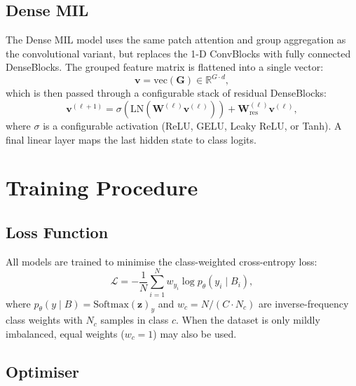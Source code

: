\documentclass[11pt,a4paper]{article}
\begin{document}
\subsection{Dense MIL}
\label{sec:dense}

The Dense MIL model uses the same patch attention and group aggregation as the
convolutional variant, but replaces the 1-D ConvBlocks with fully connected
DenseBlocks. The grouped feature matrix is flattened into a single vector:
\begin{equation}
  \mathbf{v} = \text{vec}(\mathbf{G}) \in \mathbb{R}^{G \cdot d},
\end{equation}
which is then passed through a configurable stack of residual DenseBlocks:
\begin{equation}
  \mathbf{v}^{(\ell+1)} = \sigma\!\left(\text{LN}\!\left(\mathbf{W}^{(\ell)}\mathbf{v}^{(\ell)}\right)\right) + \mathbf{W}_{\text{res}}^{(\ell)}\mathbf{v}^{(\ell)},
\end{equation}
where $\sigma$ is a configurable activation (ReLU, GELU, Leaky ReLU, or Tanh).
A final linear layer maps the last hidden state to class logits.

\section{Training Procedure}
\label{sec:training}

\subsection{Loss Function}

All models are trained to minimise the class-weighted cross-entropy loss:
\begin{equation}
  \mathcal{L} = -\frac{1}{N}\sum_{i=1}^{N} w_{y_i} \log p_{\theta}(y_i \mid B_i),
\end{equation}
where $p_{\theta}(y \mid B) = \text{Softmax}(\mathbf{z})_y$ and
$w_c = N / (C \cdot N_c)$ are inverse-frequency class weights with $N_c$ samples
in class $c$. When the dataset is only mildly imbalanced, equal weights
($w_c = 1$) may also be used.

\subsection{Optimiser}
\end{document}
